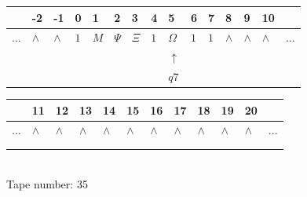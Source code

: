 \documentclass[11pt]{article}
\begin{document}
\begin{table}[H]
\centering
\begin{tabular}{lllllllllllllll}
 & -2 & -1 & 0 & 1 & 2 & 3 & 4 & 5 & 6 & 7 & 8 & 9 & 10 & \\
\hline
$...$ & \multicolumn{1}{|l|}{$\wedge$} & \multicolumn{1}{|l|}{$\wedge$} & \multicolumn{1}{|l|}{$1$} & \multicolumn{1}{|l|}{$M$} & \multicolumn{1}{|l|}{$\Psi$} & \multicolumn{1}{|l|}{$\Xi$} & \multicolumn{1}{|l|}{$1$} & \multicolumn{1}{|l|}{$\Omega$} & \multicolumn{1}{|l|}{$1$} & \multicolumn{1}{|l|}{$1$} & \multicolumn{1}{|l|}{$\wedge$} & \multicolumn{1}{|l|}{$\wedge$} & \multicolumn{1}{|l|}{$\wedge$} & $...$\\
\hline
&  &  &  &  &  &  &  & $\uparrow$ &  &  &  &  &  &  \\
&  &  &  &  &  &  &  & $ q7 $ &  &  &  &  &  &  \\
\end{tabular}
\begin{tabular}{llllllllllll}
 & 11 & 12 & 13 & 14 & 15 & 16 & 17 & 18 & 19 & 20 & \\
\hline
$...$ & \multicolumn{1}{|l|}{$\wedge$} & \multicolumn{1}{|l|}{$\wedge$} & \multicolumn{1}{|l|}{$\wedge$} & \multicolumn{1}{|l|}{$\wedge$} & \multicolumn{1}{|l|}{$\wedge$} & \multicolumn{1}{|l|}{$\wedge$} & \multicolumn{1}{|l|}{$\wedge$} & \multicolumn{1}{|l|}{$\wedge$} & \multicolumn{1}{|l|}{$\wedge$} & \multicolumn{1}{|l|}{$\wedge$} & $...$\\
\hline
&  &  &  &  &  &  &  &  &  &  &  \\
&  &  &  &  &  &  &  &  &  &  &  \\
\end{tabular}
\\
Tape number: 35
\noindent\makebox[\linewidth]{\hdashrule{\textwidth}{1pt}{1pt}}\end{table}
\clearpage
\end{document}
